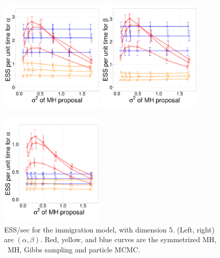   \begin{figure}[H]
  \begin{minipage}[hp]{0.65\linewidth}
  \centering
    \includegraphics [width=0.44\textwidth, angle=0]{figs/q_5_alpha.pdf}
    \includegraphics [width=0.44\textwidth, angle=0]{figs/q_5_beta.pdf}
  \end{minipage}
  \begin{minipage}[!hp]{0.33\linewidth}
    \caption{ESS/sec for the immigration model, with dimension 5. (Left, 
      right) are $(\alpha, \beta)$. Red, yellow, and blue curves are the symmetrized MH,
  \naive\ MH, Gibbs sampling and particle MCMC.}
     \label{fig:ESS_Q_D5}
  \end{minipage}
  \centering
  \begin{minipage}[!hp]{0.65\linewidth}
  \centering
    \includegraphics [width=0.44\textwidth, angle=0]{figs/pc_5_alpha.pdf}

\end{minipage}
\end{figure}
